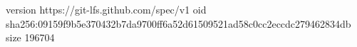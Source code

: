 version https://git-lfs.github.com/spec/v1
oid sha256:09159f9b5e370432b7da9700ff6a52d61509521ad58c0cc2eccdc279462834db
size 196704
